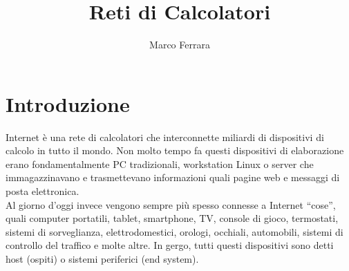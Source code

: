 \documentclass[12pt]{report}
\title{Reti di Calcolatori}
\author{Marco Ferrara}
\begin{document}
	\maketitle
	\tableofcontents
	\newpage

	\chapter{Introduzione}
	Internet è una rete di calcolatori che interconnette miliardi di dispositivi di calcolo in tutto il mondo. Non molto tempo fa questi dispositivi di elaborazione erano fondamentalmente PC tradizionali, workstation Linux o server che immagazzinavano e trasmettevano informazioni quali pagine web e messaggi di posta elettronica.
	\vspace{\baselineskip}\\
	Al giorno d’oggi invece vengono sempre più spesso connesse a Internet “cose”, quali computer portatili, tablet, smartphone, TV, console di gioco, termostati, sistemi di sorveglianza, elettrodomestici, orologi, occhiali, automobili, sistemi di controllo del traffico e molte altre. In gergo, tutti questi dispositivi sono detti host (ospiti) o sistemi periferici (end system).
			
\end{document}
